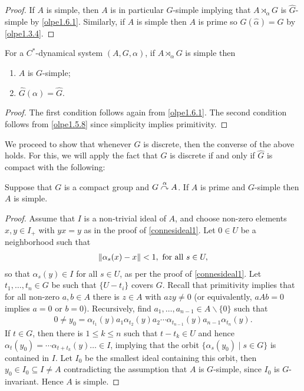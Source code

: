 \begin{proof}
	If $A$ is simple, then $A$ is in particular $G$-simple implying that $A \rtimes_\alpha G$ is $\hat G$-simple by \cref{olpe1.6.1}. Similarly, if $A$ is simple then $A$ is prime so $G(\hat \alpha) = G$ by \cref{olpe1.3.4}.
\end{proof}
\begin{proposition}
	For a $C^*$-dynamical system $(A,G,\alpha)$, if $A \rtimes_\alpha G$ is simple then 
	\begin{enumerate}
		\item $A$ is $G$-simple;
		\item $\hat G(\alpha)= \hat G$.
	\end{enumerate}
	\label{olpe1.6.3}
\end{proposition}
\begin{proof}
	The first condition follows again from \cref{olpe1.6.1}. The second condition follows from \cref{olpe1.5.8} since simplicity implies primitivity.
\end{proof}
We proceed to show that whenever $G$ is discrete, then the converse of the above holds. For this, we will apply the fact that $G$ is discrete if and only if $\hat G$ is compact with the following:
\begin{lemma}
	Suppose that $G$ is a compact group and $G \stackrel{\alpha}{\curvearrowright} A$. If $A$ is prime and $G$-simple then $A$ is simple.	
	\label{olpe1.6.4}
\end{lemma}
\begin{proof}
	Assume that $I$ is a non-trivial ideal of $A$, and choose non-zero elements $x,y \in I_+$ with $yx=y$ as in the proof of \cref{connesideal1}. Let $0 \in U$ be a neighborhood such that 
	\begin{align*}
		\left\lVert \alpha_s(x)-x\right\rVert < 1, \text{ for all }s \in U,
	\end{align*}
	so that $\alpha_s(y) \in I$ for all $s \in U$, as per the proof of \cref{connesideal1}. Let $t_1,\dots,t_n \in G$ be such that $\{ U - t_i\}$ covers $G$. Recall that primitivity implies that for all non-zero $a,b \in A$ there is $z \in A$ with $azy \neq 0$ (or equivalently, $aAb = 0 $ implies $a=0$ or $b = 0$). Recursively, find $a_1,\dots,a_{n-1} \in A \backslash \{0\}$ such that
	\begin{align*}
	0 \neq	y_0 = \alpha_{t_1}(y) a_1 \alpha_{t_2}(y) a_2\cdots \alpha_{t_{n-1}}(y) a_{n-1} \alpha_{t_n}(y).
	\end{align*}
	If $t \in G$, then there is $1 \leq k \leq n$ such that $t-t_k \in U$ and hence $\alpha_t(y_0) = \cdots \alpha_{t+t_k}(y) \dots \in I$, implying that the orbit $\{\alpha_s(y_0) \mid s \in G\}$ is contained in $I$. Let $I_0$ be the smallest ideal containing this orbit, then $y_0 \in I_0 \subseteq I \neq A$ contradicting the assumption that $A$ is $G$-simple, since $I_0$ is $G$-invariant. Hence $A$ is simple.
\end{proof}

